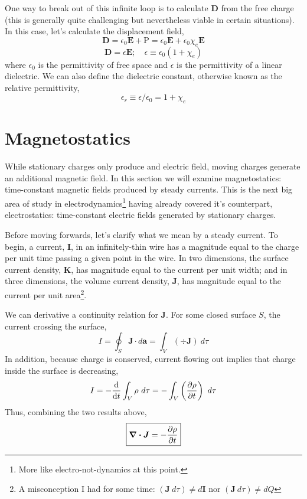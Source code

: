 \documentclass[12pt]{report}
\numberwithin{equation}{section}
\def\P{{\mbox{$\boldsymbol{\mathrm{P}}$}}}
\def\E{{\mbox{$\boldsymbol{E}$}}}
\renewcommand{\b}[1]{\boldsymbol{#1}}
\begin{document}
	One way to break out of this infinite loop is to calculate $ \b{D} $ from the free charge (this is generally quite challenging but nevertheless viable in certain situations). In this case, let's calculate the displacement field,
	\begin{equation}
		\b{D} = \epsilon_0\E + \P = \epsilon_0\E + \epsilon_0\chi_e\E
	\end{equation}
	\begin{equation}
		\boxed{\b{D} = \epsilon\E;\quad \epsilon\equiv \epsilon_0 \left(1 + \chi_e\right)}
	\end{equation}
	where $ \epsilon_0 $ is the permittivity of free space and $ \epsilon $ is the permittivity of a linear dielectric. We can also define the dielectric constant, otherwise known as the relative permittivity,
	\begin{equation}
		\epsilon_r \equiv \epsilon/\epsilon_0 = 1+\chi_e
	\end{equation}
	
	\chapter{Magnetostatics}
	
	While stationary charges only produce and electric field, moving charges generate an additional magnetic field. In this section we will examine magnetostatics: time-constant magnetic fields produced by steady currents. This is the next big area of study in electrodynamics\footnote{More like electro-not-dynamics at this point.} having already covered it's counterpart, electrostatics: time-constant electric fields generated by stationary charges.
	
	Before moving forwards, let's clarify what we mean by a steady current. To begin, a current, $ \b{I}$, in an infinitely-thin wire has a magnitude equal to the charge per unit time passing a given point in the wire. In two dimensions, the surface current density, $ \b{K} $, has magnitude equal to the current per unit width; and in three dimensions, the volume current density, $ \b{J} $, has magnitude equal to the current per unit area\footnote{A misconception I had for some time: $ (\b{J}\ d\tau)\neq d\b{I} $ nor $ (\b{J} \ d\tau)\neq dQ $}.
	
	We can derivative a continuity relation for $ \b{J} $. For some closed surface $ S $, the current crossing the surface, 
	\begin{equation}
		I = \oint_S \b{J}\cdot d\b{a} = \int_V \left(\div \b{J}\right)\ d\tau
	\end{equation}
	In addition, because charge is conserved, current flowing out implies that charge inside the surface is decreasing,
	\begin{equation}
		I = -\dv{}{t}\int_V \rho\ d\tau = -\int_V \left(\pdv{\rho}{t}\right)\ d\tau
	\end{equation}
	Thus, combining the two results above,
	\begin{equation}
		\boxed{\div \b{J} =-\pdv{\rho}{t} }
	\end{equation}
	
\end{document}
